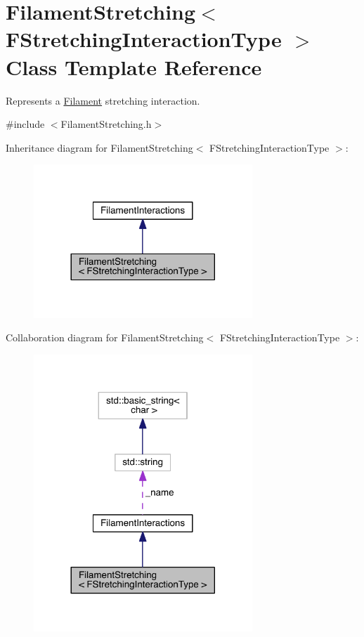 \hypertarget{classFilamentStretching}{\section{Filament\+Stretching$<$ F\+Stretching\+Interaction\+Type $>$ Class Template Reference}
\label{classFilamentStretching}
}


Represents a \hyperlink{classFilament}{Filament} stretching interaction.  




{\ttfamily \#include $<$Filament\+Stretching.\+h$>$}



Inheritance diagram for Filament\+Stretching$<$ F\+Stretching\+Interaction\+Type $>$\+:\nopagebreak
\begin{figure}[H]
\begin{center}
\leavevmode
\includegraphics[width=233pt]{classFilamentStretching__inherit__graph}
\end{center}
\end{figure}


Collaboration diagram for Filament\+Stretching$<$ F\+Stretching\+Interaction\+Type $>$\+:\nopagebreak
\begin{figure}[H]
\begin{center}
\leavevmode
\includegraphics[width=233pt]{classFilamentStretching__coll__graph}
\end{center}
\end{figure}
